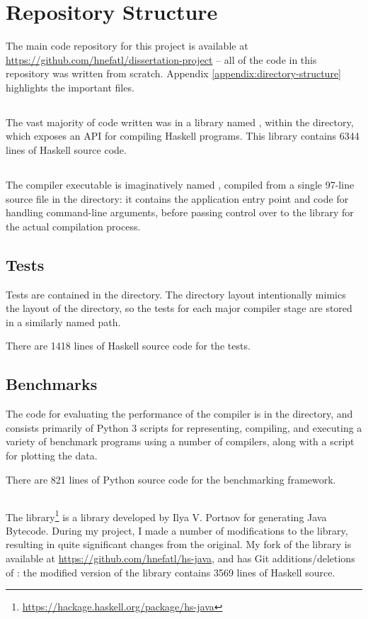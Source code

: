 \documentclass[dissertation.tex]{subfiles}
\begin{document}
\section{Repository Structure}
{
    The main code repository for this project is available at \url{https://github.com/hnefatl/dissertation-project} -- all of the code in this repository was written from scratch. Appendix \ref{appendix:directory-structure} highlights the important files.

    \subsection{}
    {
        The vast majority of code written was in a library named , within the  directory, which exposes an API for compiling Haskell programs. This library contains 6344 lines of Haskell source code.
    }
    \subsection{}
    {
        The compiler executable is imaginatively named , compiled from a single 97-line source file  in the  directory: it contains the application entry point and code for handling command-line arguments, before passing control over to the  library for the actual compilation process.
    }
    \subsection{Tests}
    {
        Tests are contained in the  directory. The directory layout intentionally mimics the layout of the  directory, so the tests for each major compiler stage are stored in a similarly named path.

        There are 1418 lines of Haskell source code for the tests.
    }
    \subsection{Benchmarks}
    {
        The code for evaluating the performance of the compiler is in the  directory, and consists primarily of Python 3 scripts for representing, compiling, and executing a variety of benchmark programs using a number of compilers, along with a script for plotting the data.

        There are 821 lines of Python source code for the benchmarking framework.
    }
    \subsection{}
    {
        The  library\footnote{\url{https://hackage.haskell.org/package/hs-java}} is a library developed by Ilya V. Portnov for generating Java Bytecode. During my project, I made a number of modifications to the library, resulting in quite significant changes from the original. My fork of the library is available at \url{https://github.com/hnefatl/hs-java}, and has Git additions/deletions of : the modified version of the library contains 3569 lines of Haskell source.
    }
}
\end{document}
